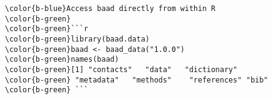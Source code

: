 \documentclass[class=minimal,border=0]{standalone}
\begin{document}
%
\begin{BVerbatim}[bgcolor=b-darkgrey]
\color{b-blue}Access baad directly from within R
\color{b-green}
\color{b-green}```r
\color{b-green}library(baad.data)
\color{b-green}baad <- baad_data("1.0.0")
\color{b-green}names(baad)
\color{b-green}[1] "contacts"   "data"   "dictionary" 
\color{b-green} "metadata"   "methods"    "references" "bib" 
\color{b-green} ```
\end{BVerbatim}
\end{document}
